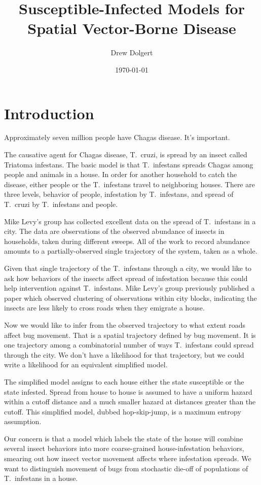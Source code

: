 \documentclass{article}
\title{Susceptible-Infected Models for Spatial Vector-Borne Disease}
\author{Drew Dolgert}
\date{\today}
\begin{document}
\maketitle

\section{Introduction}
Approximately seven million people have Chagas disease. It's important.

The causative agent for Chagas disease, T.\ cruzi, is spread by
an insect called Triatoma infestans. The basic model is that 
T.\ infestans spreads Chagas among people and animals in a house.
In order for another household to catch the disease, either people
or the T.\ infestans travel to neighboring houses.
There are three levels, behavior of people, infestation by
T.\ infestans, and spread of T.\ cruzi by T.\ infestans and people.

Mike Levy's group has collected excellent data on the spread of
T.\ infestans in a city. The data are observations of the observed
abundance of insects in households, taken during different sweeps.
All of the work to record abundance amounts to a partially-observed
single trajectory of the system, taken as a whole.

Given that single trajectory of the T.\ infestans through a city,
we would like to ask how behaviors of the insects affect spread
of infestation because this could help intervention against
T.\ infestans. Mike Levy's group previously published a paper
which observed clustering of observations within city blocks,
indicating the insects are less likely to cross roads when
they emigrate a house.

Now we would like to infer from the observed trajectory
to what extent roads affect bug movement. That is a spatial
trajectory defined by bug movement. It is one trajectory
among a combinatorial number of ways T.\ infestans could spread
through the city. We don't have a likelihood for that trajectory,
but we could write a likelihood for an equivalent simplified model.

The simplified model assigns to each house either the state
susceptible or the state infested. Spread from house to house
is assumed to have a uniform hazard within a cutoff distance
and a much smaller hazard at distances greater than the cutoff.
This simplified model, dubbed hop-skip-jump, is a maximum
entropy assumption.

Our concern is that a model which labels the state of the
house will combine several insect behaviors into more
coarse-grained house-infestation behaviors, smearing out
how insect vector movement affects where infestation spreads.
We want to distinguish movement of bugs from stochastic
die-off of populations of T.\ infestans in a house.
\end{document}
